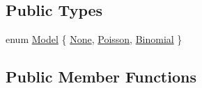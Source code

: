 \subsection*{Public Types}
\begin{DoxyCompactItemize}
\item 
enum \hyperlink{classLikelihoodCollection_a3d71df2ed0bdff414ae5fedb30f7cc76}{Model} \{ \hyperlink{classLikelihoodCollection_a3d71df2ed0bdff414ae5fedb30f7cc76a1f3fa362dbbf13c3fa8c732c6125b040}{None}, 
\hyperlink{classLikelihoodCollection_a3d71df2ed0bdff414ae5fedb30f7cc76afdc2c0395310f3e3a033a8b4239c5927}{Poisson}, 
\hyperlink{classLikelihoodCollection_a3d71df2ed0bdff414ae5fedb30f7cc76aea62206336d47863916f4eaa6dc99662}{Binomial}
 \}
\end{DoxyCompactItemize}
\subsection*{Public Member Functions}
